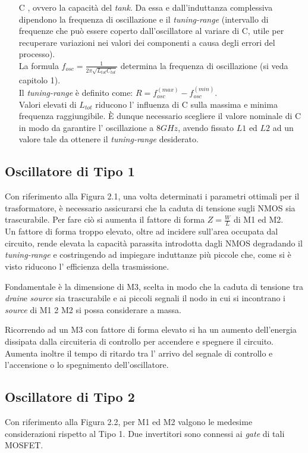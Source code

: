 \documentclass[a4paper, 12pt]{memoir}
\begin{document}
\begin{enumerate}
\item[C], ovvero la capacità del \emph{tank}. Da essa e dall'induttanza
	complessiva dipendono la frequenza di oscillazione e il
	\emph{tuning-range} (intervallo di frequenze che può essere coperto
	dall'oscillatore al variare di C, utile per recuperare variazioni nei
	valori dei componenti a causa degli errori del processo).\\
	La formula $ f_{osc}=\frac{1}{2\pi\sqrt{L_{tot}C_{tot}}}$ determina la
	frequenza di oscillazione (si veda capitolo 1).
	\\Il \emph{tuning-range} è definito come: $ R = f_{osc}^{(max)} -
	f_{osc}^{(min)} $.\\
	Valori elevati di $L_{tot}$ riducono l' influenza di C sulla massima e
	minima frequenza raggiungibile. \`E dunque necessario scegliere il valore
	nominale di C in modo da garantire l' oscillazione a $8GHz$, avendo
	fissato $L1$ ed $L2$ ad un valore tale da ottenere il \emph{tuning-range}
	desiderato.
\end{enumerate}

\subsection{Oscillatore di Tipo 1}
Con riferimento alla Figura 2.1, una volta determinati i parametri ottimali per
il trasformatore, è necessario assicurarsi che la caduta di tensione sugli NMOS
sia trascurabile. Per fare ciò si aumenta il fattore di forma $Z = \frac{W}{L}$
di M1 ed M2.\\
Un fattore di forma troppo elevato, oltre ad incidere sull'area occupata dal 
circuito, rende elevata la capacità parassita introdotta dagli NMOS degradando
il \emph{tuning-range} e costringendo ad impiegare induttanze più piccole che,
come si è visto riducono l' efficienza della trasmissione.

Fondamentale è la dimensione di M3, scelta in modo che la caduta di tensione
tra \emph{drain}e \emph{source} sia trascurabile e ai piccoli segnali il nodo
in cui si incontrano i \emph{source} di M1 2 M2 si possa considerare a massa.

Ricorrendo ad un M3 con fattore di forma elevato si ha un aumento dell'energia
dissipata dalla circuiteria di controllo per accendere e spegnere il circuito.
Aumenta inoltre il tempo di ritardo tra l' arrivo del segnale di controllo e 
l'accensione o lo spegnimento dell'oscillatore.

\subsection{Oscillatore di Tipo 2}
Con riferimento alla Figura 2.2, per M1 ed M2 valgono le medesime
considerazioni rispetto al Tipo 1.
Due invertitori sono connessi ai \emph{gate} di tali MOSFET.
\end{document}
